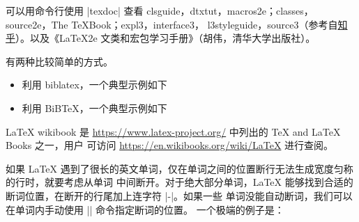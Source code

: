 
可以用命令行使用 |texdoc| 查看 clsguide，dtxtut，macros2e；classes，source2e，The TeXBook；expl3，interface3，
l3styleguide，source3（参考自\href{https://www.zhihu.com/question/27017364}{知乎}）。以及《\LaTeX{2e}
文类和宏包学习手册》（胡伟，清华大学出版社）。









有两种比较简单的方式。
\begin{itemize}
\item 利用 biblatex，一个典型示例如下
\item 利用 BiB\TeX，一个典型示例如下
\end{itemize}











\LaTeX{} wikibook 是 \url{https://www.latex-project.org/} 中列出的 \TeX{} and \LaTeX{} Books 之一，用户
可访问 \url{https://en.wikibooks.org/wiki/LaTeX} 进行查阅。


如果 \LaTeX{} 遇到了很长的英文单词，仅在单词之间的位置断行无法生成宽度匀称的行时，就要考虑从单词
中间断开。对于绝大部分单词，\LaTeX{} 能够找到合适的断词位置，在断开的行尾加上连字符 |-|。如果一些
单词没能自动断词，我们可以在单词内手动使用 |\-| 命令指定断词的位置。
一个极端的例子是：

